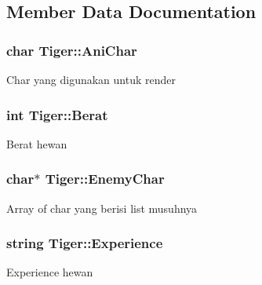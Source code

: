 \subsection{Member Data Documentation}
\subsubsection[{\texorpdfstring{Ani\+Char}{AniChar}}]{\setlength{\rightskip}{0pt plus 5cm}char Tiger\+::\+Ani\+Char\hspace{0.3cm}{\ttfamily [protected]}}\hypertarget{class_tiger_a5a0cb7d341ab62aeff1f9762f24d4bf9}{}\label{class_tiger_a5a0cb7d341ab62aeff1f9762f24d4bf9}
Char yang digunakan untuk render 
\subsubsection[{\texorpdfstring{Berat}{Berat}}]{\setlength{\rightskip}{0pt plus 5cm}int Tiger\+::\+Berat\hspace{0.3cm}{\ttfamily [protected]}}\hypertarget{class_tiger_ad84a8d5962f7de935246be3682dbdd15}{}\label{class_tiger_ad84a8d5962f7de935246be3682dbdd15}
Berat hewan 
\subsubsection[{\texorpdfstring{Enemy\+Char}{EnemyChar}}]{\setlength{\rightskip}{0pt plus 5cm}char$\ast$ Tiger\+::\+Enemy\+Char\hspace{0.3cm}{\ttfamily [protected]}}\hypertarget{class_tiger_a418b4305ac370e8a64621c24984115a1}{}\label{class_tiger_a418b4305ac370e8a64621c24984115a1}
Array of char yang berisi list musuhnya 
\subsubsection[{\texorpdfstring{Experience}{Experience}}]{\setlength{\rightskip}{0pt plus 5cm}string Tiger\+::\+Experience\hspace{0.3cm}{\ttfamily [protected]}}\hypertarget{class_tiger_a94e7d699e66aa4d3027f64837c2d5f11}{}\label{class_tiger_a94e7d699e66aa4d3027f64837c2d5f11}
Experience hewan 
